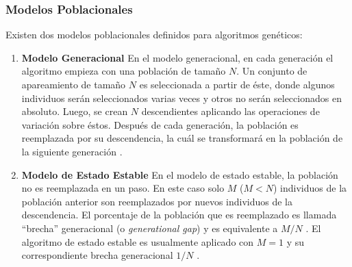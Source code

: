 \subsubsection{Modelos Poblacionales}
Existen dos modelos poblacionales definidos para algoritmos genéticos:

\begin{enumerate}
    \item {\bf Modelo Generacional}
En el modelo generacional, en cada generación el algoritmo empieza con una población de tamaño $N$. Un conjunto de apareamiento de tamaño $N$ es seleccionada a partir de éste, donde algunos individuos serán seleccionados varias veces y otros no serán seleccionados en absoluto. Luego, se crean $N$ descendientes aplicando las operaciones de variación sobre éstos. Después de cada generación, la población es reemplazada por su descendencia, la cuál se transformará en la población de la siguiente generación \cite{grosan2011intelligent}.

\item {\bf Modelo de Estado Estable}
En el modelo de estado estable, la población no es reemplazada en un paso. En este caso solo $M$ ($M<N$) individuos de la población anterior son reemplazados por nuevos individuos de la descendencia. El porcentaje de la población que es reemplazado es llamada ``brecha'' generacional (o \emph{generational gap}) y es equivalente a $M/N$ \cite{grosan2011intelligent}. El algoritmo de estado estable es usualmente aplicado con $M=1$ y su correspondiente brecha generacional $1/N$ \cite{eiben2003introduction}.
\end{enumerate}

